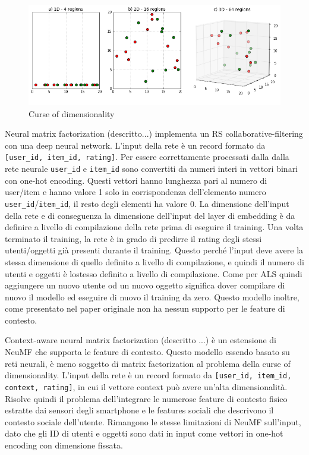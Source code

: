 \begin{figure}
  \includegraphics[width=\linewidth]{immagini/curse_of_dimensionality.png}
  \caption{Curse of dimensionality}
  \label{fig:curse-dim}
\end{figure}

Neural matrix factorization (descritto...) implementa un RS
collaborative-filtering con una deep neural network. L'input della 
rete è un record formato da \texttt{[user\_id, item\_id, rating]}.
Per essere correttamente processati dalla dalla rete neurale \texttt{user\_id} e \texttt{item\_id} sono convertiti da numeri interi in vettori binari con one-hot encoding. Questi vettori hanno lunghezza pari al numero di 
user/item e hanno valore 1 solo in corrispondenza dell'elemento numero 
\texttt{user\_id}/\texttt{item\_id}, il resto degli elementi ha valore 0. La dimensione dell'input della rete e di conseguenza la dimensione dell'input del layer di embedding è da definire a livello di compilazione della rete prima di eseguire il training. Una volta terminato il training, la rete è in grado di predirre il rating degli stessi utenti/oggetti già presenti durante il training. Questo perché l'input deve avere la stessa dimensione di quello definito a livello di compilazione, e quindi il numero di utenti e oggetti è lostesso definito a livello di compilazione. Come per ALS quindi aggiungere un nuovo utente od un nuovo oggetto significa dover compilare di nuovo il modello ed eseguire di nuovo il training da zero. Questo modello inoltre, come presentato nel paper originale \cite{NCF} non ha nessun supporto per le feature di contesto.

Context-aware neural matrix factorization (descritto ...) è un estensione di NeuMF che supporta le feature di contesto. Questo modello essendo basato su reti neurali, è meno soggetto di matrix factorization al problema della curse of dimensionality. L'input della rete è un record formato da \texttt{[user\_id, item\_id, context, rating]}, in cui il vettore context può avere un'alta dimensionalità. Risolve quindi il problema dell'integrare le numerose feature di contesto fisico estratte dai sensori degli smartphone e le features sociali che descrivono il contesto sociale dell'utente. Rimangono le stesse limitazioni di NeuMF sull'input, dato che gli ID di utenti e oggetti sono dati in input come vettori in one-hot encoding con dimensione fissata.
